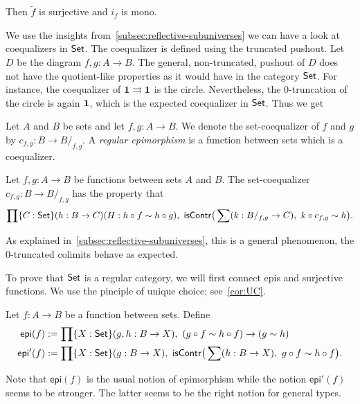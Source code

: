 \begin{lem}
Then $\tilde{f}$ is surjective and $i_f$ is mono.
\end{lem}

We use the insights from~\autoref{subsec:reflective-subuniverses} we can have a look at coequalizers
in $\mathsf{Set}$. The coequalizer is defined using the truncated pushout. Let $D$ be the diagram $f,g:A\to B$.
The general, non-truncated, pushout of $D$ does not have the quotient-like properties as it would
have in the category $\mathsf{Set}$. For instance, the coequalizer of
$\mathbf{1}\rightrightarrows\mathbf{1}$ is the circle. Nevertheless,
the $0$-truncation of the circle is again $\mathbf{1}$, which is the
expected coequalizer in $\mathsf{Set}$. Thus we get

\begin{defn}
Let $A$ and $B$ be sets and let $f,g:A\to B$.
We denote the set-coequalizer of $f$ and $g$ by $c_{f,g}:B\to B/_{f,g}$. A
\emph{regular epimorphism} is a function between sets which is a coequalizer.
\end{defn}

\begin{lem}
Let $f,g:A\to B$ be functions between sets $A$ and $B$. The 
{set-co}equalizer $c_{f,g}:B\to B/_{f,g}$ has the property that
\begin{equation*}
\prod\{C:\set\}(h:B\to C)(H:h\circ f\sim h\circ g),\ 
\mathsf{isContr}\big(\sum(k:B/_{f,g}\to C),\ k\circ c_{f,g}\sim h\big).
\end{equation*}
\end{lem}

As explained in~\autoref{subsec:reflective-subuniverses}, this is a general phenomenon, the 0-truncated colimits behave as expected.

To prove that $\mathsf{Set}$ is a regular category, we will first connect epis and surjective functions. 
We use the pinciple of unique choice; see~\autoref{cor:UC}. 

\begin{defn}
Let $f:A\to B$ be a function between sets. Define
\begin{align*}
\mathsf{epi}(f) & := \prod\{X:\set\}(g,h:B\to X),\ 
(g\circ f\sim h\circ f)\to (g\sim h)\\
\mathsf{epi}'(f) & :=\prod\{X:\set\}(g:B\to X),\ 
\mathsf{isContr}\big(\sum(h:B\to X),\ g\circ f\sim h\circ f\big).
\end{align*}
\end{defn}

Note that $\mathsf{epi}(f)$ is the usual notion of epimorphism while the
notion $\mathsf{epi}'(f)$ seems to be stronger. The latter seems to be the right notion for general types.

